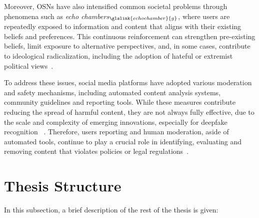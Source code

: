 Moreover, OSNs have also intensified common societal problems through phenomena such as \textit{echo chambers}$_{\glslink{echochamber}{g}}$, where users are repeatedly exposed to information and content that aligns with their existing beliefs and preferences. This continuous reinforcement can strengthen pre-existing beliefs, limit exposure to alternative perspectives, and, in some cases, contribute to ideological radicalization, including the adoption of hateful or extremist political views~\cite{site:social-echochamber}.

To address these issues, social media platforms have adopted various moderation and safety mechanisms, including automated content analysis systems, community guidelines and reporting tools. While these measures contribute reducing the spread of harmful content, they are not always fully effective, due to the scale and complexity of emerging innovations, especially for deepfake recognition ~\cite{site:social-deepfake-recognition}. Therefore, users reporting and human moderation, aside of automated tools, continue to play a crucial role in identifying, evaluating and removing content that violates policies or legal regulations~\cite{article:human-moderation}.

\section{Thesis Structure}

In this subsection, a brief description of the rest of the thesis is given:

